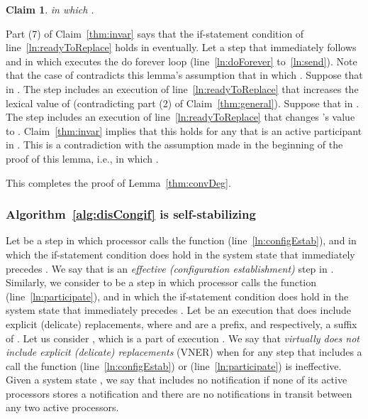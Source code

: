 \documentclass[11pt]{article}
\newtheorem{claim}[theorem]{Claim}
\newenvironment{proof}{\noindent{\bf Proof.}}{\hfill}
\begin{document}
\begin{proof}
\begin{claim}
\label{thm:contra}
 in which .
\end{claim}
\begin{proof}
Part (7) of Claim~\ref{thm:invar} says that the if-statement condition of line~\ref{ln:readyToReplace} holds in  eventually. Let  a step that immediately follows  and in which  executes the do forever loop (line~\ref{ln:doForever} to~\ref{ln:send}).
Note that the case of  contradicts this lemma's assumption that  in which .
Suppose that  in . The step  includes an execution of line~\ref{ln:readyToReplace} that increases the lexical value of  (contradicting part (2) of Claim~\ref{thm:general}).
Suppose that  in . The step  includes an execution of line~\ref{ln:readyToReplace} that changes 's value to . Claim~\ref{thm:invar} implies that this holds for any  that is an active participant in . This is a contradiction with the assumption made in the beginning of the proof of this lemma, i.e.,  
 in which .
\end{proof}

\medskip

\noindent This completes the proof of Lemma~\ref{thm:convDeg}.\hfill\end{proof}






\subsubsection*{Algorithm~\ref{alg:disCongif} is self-stabilizing}
Let  be a step in which processor  calls the function  (line~\ref{ln:configEstab}), and in which the if-statement condition  does hold in the system state that immediately precedes . We say that  is an \emph{effective  (configuration establishment)} step in . Similarly, we consider  to be a step in which processor  calls the function  (line~\ref{ln:participate}), and in which the if-statement condition  does hold in the system state that immediately precedes .
Let  be an execution that does include explicit (delicate) replacements, where  and  are a prefix, and respectively, a suffix of . Let us consider , which is a part of execution . We say that  \emph{virtually does not include explicit (delicate) replacements} (VNER) when for any step  that includes a call the function  (line~\ref{ln:configEstab}) or  (line~\ref{ln:participate}) is ineffective. Given a system state , we say that  includes no notification if none of its active processors stores a notification and there are no notifications in transit between any two active processors. 
\end{document}
